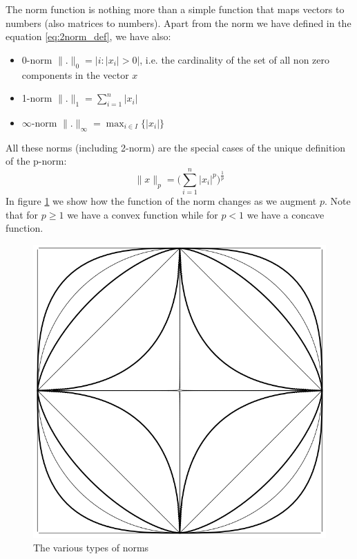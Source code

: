The norm function is nothing more than a simple function that maps vectors to numbers (also matrices to numbers). Apart from the norm we have defined in the equation \ref{eq:2norm_def}, we have also:
\begin{itemize}
    \item 0-norm $\lVert . \rVert_0 = |i : |x_i| > 0|$, i.e. the cardinality of the set of all non zero components in the vector $x$
    \item 1-norm $\lVert . \rVert_1 = \sum_{i=1}^n |x_i|$
    \item $\infty$-norm $\lVert . \rVert_\infty = \max_{i \in I}\{|x_i|\}$
\end{itemize}
All these norms (including 2-norm) are the special cases of the unique definition of the p-norm:
\begin{equation}
    \lVert x \rVert_p = \Big(\sum_{i=1}^n |x_i|^p\Big)^{\frac{1}{p}}
    \label{eq:p_norm}
\end{equation}
In figure \ref{fig:norms} we show how the function of the norm changes as we augment $p$. Note that for $p \geq 1$ we have a convex function while for $p < 1$ we have a concave function.
\begin{figure}
    \centering
    \includegraphics[scale=0.4]{figures/1/1-norms.png}
    \caption{The various types of norms}
    \label{fig:norms}
\end{figure}
